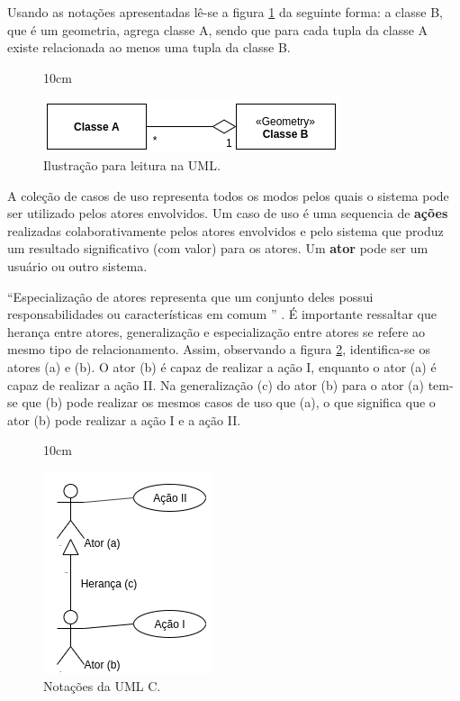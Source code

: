 Usando as notações apresentadas lê-se a figura \ref{uml_leitura} da seguinte forma:
a classe B, que é um geometria, agrega classe A, sendo que para cada tupla da classe A existe relacionada ao menos uma tupla da classe B.

\begin{figure}[!ht]{10cm}
  \caption{Ilustração para leitura na UML.} \label{uml_leitura}
  \includegraphics[width=0.75\hsize]{figuras/uml_leitura.png}
\end{figure}

\begin{citacao}
    A coleção de casos de uso representa todos os modos pelos quais o sistema pode ser utilizado pelos atores envolvidos. Um caso de uso é uma sequencia de \textbf{ações} realizadas colaborativamente pelos atores envolvidos e pelo sistema que produz um resultado significativo (com valor) para os atores. Um \textbf{ator} pode ser um usuário ou outro sistema. \cite[p.10]{tacla2007analise}
\end{citacao}


``Especialização de atores representa que um conjunto deles possui responsabilidades ou características em comum '' \cite[p.29]{tacla2007analise}. É importante ressaltar que herança entre atores, generalização e especialização entre atores se refere ao mesmo tipo de relacionamento. Assim, observando a figura \ref{uml_casouso}, identifica-se os atores (a) e (b). O ator (b) é capaz de realizar a ação I, enquanto o ator (a) é capaz de realizar a ação II. Na generalização (c) do ator (b) para o ator (a) tem-se que (b) pode realizar os mesmos casos de uso que (a), o que significa que o ator (b) pode realizar a ação I e a ação II. 

\begin{figure}[!ht]{10cm}
  \caption{Notações da UML C.} \label{uml_casouso}
  \includegraphics[width=0.5\hsize]{figuras/uml_casosuso.png}
\end{figure}

